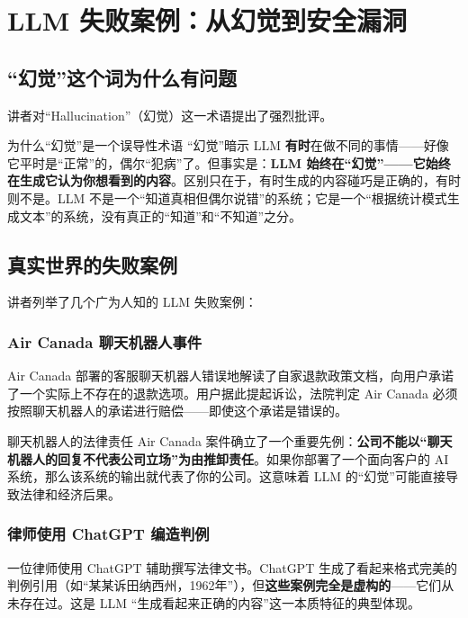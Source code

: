 \section{LLM 失败案例：从幻觉到安全漏洞}

\subsection{``幻觉''这个词为什么有问题}

讲者对``Hallucination''（幻觉）这一术语提出了强烈批评。

\begin{importantbox}{为什么``幻觉''是一个误导性术语}
``幻觉''暗示 LLM \textbf{有时}在做不同的事情——好像它平时是``正常''的，偶尔``犯病''了。但事实是：\textbf{LLM 始终在``幻觉''——它始终在生成它认为你想看到的内容}。区别只在于，有时生成的内容碰巧是正确的，有时则不是。LLM 不是一个``知道真相但偶尔说错''的系统；它是一个``根据统计模式生成文本''的系统，没有真正的``知道''和``不知道''之分。
\end{importantbox}

\subsection{真实世界的失败案例}

讲者列举了几个广为人知的 LLM 失败案例：

\subsubsection{Air Canada 聊天机器人事件}

Air Canada 部署的客服聊天机器人错误地解读了自家退款政策文档，向用户承诺了一个实际上不存在的退款选项。用户据此提起诉讼，法院判定 Air Canada 必须按照聊天机器人的承诺进行赔偿——即使这个承诺是错误的。

\begin{warningbox}{聊天机器人的法律责任}
Air Canada 案件确立了一个重要先例：\textbf{公司不能以``聊天机器人的回复不代表公司立场''为由推卸责任}。如果你部署了一个面向客户的 AI 系统，那么该系统的输出就代表了你的公司。这意味着 LLM 的``幻觉''可能直接导致法律和经济后果。
\end{warningbox}

\subsubsection{律师使用 ChatGPT 编造判例}

一位律师使用 ChatGPT 辅助撰写法律文书。ChatGPT 生成了看起来格式完美的判例引用（如``某某诉田纳西州，1962年''），但\textbf{这些案例完全是虚构的}——它们从未存在过。这是 LLM ``生成看起来正确的内容''这一本质特征的典型体现。

